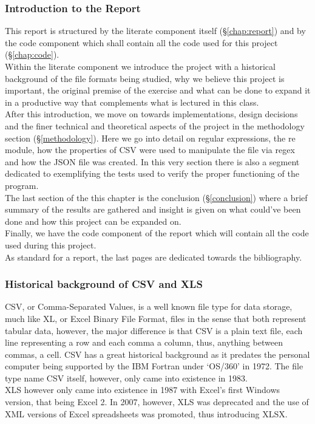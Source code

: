 \documentclass[11pt,a4paper,times]{report}
\def\CSV{Comma-Separated Values\xspace}
\def\XLS{Excel Binary File Format\xspace}
\begin{document}
\subsubsection{Introduction to the Report} This report is structured by 
the literate component itself (\S\ref{chap:report}) and by the code component
which shall contain all the code used for this project (\S\ref{chap:code}).
\\
Within the literate component we introduce the project with a historical
background of the file formats being studied, why we believe this project
is important, the original premise of the exercise and what can be
done to expand it in a productive way that complements what is lectured
in this class.
\\
After this introduction, we move on towards implementations, design 
decisions and the finer technical and theoretical aspects of the project
in the methodology section (\S\ref{methodology}). Here we go into detail on 
regular expressions, the re module, how the properties of CSV were used
to manipulate the file via regex and how the JSON file was created.
In this very section there is also a segment dedicated to exemplifying 
the tests used to verify the proper functioning of the program.
\\
The last section of the this chapter is the conclusion (\S\ref{conclusion})
where a brief summary of the results are gathered and insight is given on
what could've been done and how this project can be expanded on.
\\
Finally, we have the code component of the report which will contain all
the code used during this project.
\\
As standard for a report, the last pages are dedicated towards the
bibliography.

\subsubsection{Historical background of CSV and XLS}CSV, or \CSV, is a
well known file type for data storage, much like XL, or \XLS, files in 
the sense that both represent tabular data, however, the major difference
is that CSV is a plain text file, each line representing a row and each 
comma a column, thus, anything between commas, a cell. CSV has a great 
historical background as it predates the personal computer being 
supported by the IBM Fortran under `OS/360' in 1972. \cite{FORTRANCSV}
The file type name CSV itself, however, only came into existence in 1983.
\\
XLS however only came into existence in 1987 with Excel's first Windows 
version, that being Excel 2. \cite{EXCELOR} In 2007, however, XLS was deprecated and the
use of XML versions of Excel spreadsheets was promoted, thus
introducing XLSX.
\end{document}
